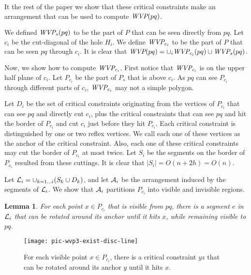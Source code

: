 \documentclass[5p]{elsarticle}
\newtheorem{lemma}[theorem]{Lemma}
\def\WVP{\mbox{\it{WVP}}}
\def\P{\mbox{${P}$}}
\begin{document}
It the rest of the paper we show that these critical constraints make an arrangement
that can be used to compute $\WVP(pq)$.  



We defined $\WVP_s(pq)$ to be the part of $\P$ that can be seen directly from $pq$.
Let $c_i$ be the cut-diagonal of the hole $H_i$.
We define $\WVP_{c_i}$ to be the part of $\P$ that can be seen $pq$ through $c_i$.
It is clear that $\WVP(pq) =  \cup_{i} \WVP_{c_i}(pq) \cup \WVP_s(pq) $. 

Now, we show how to compute $\WVP_{c_i}$. First notice that $\WVP_{c_i}$ is on the
upper half plane of $c_i$.
Let $\P_{c_i}$ be the part of $\P_s$ that is above $c_i$. 
As $pq$ can see $\P_{c_i}$ through different parts of $c_i$, $\WVP_{c_i}$
may not a simple polygon.

Let $D_i$ be the set of critical constraints originating from the vertices of $\P_{c_i}$
that can see $pq$ and directly cut $c_i$, plus the critical constraints
that can see $pq$ and hit the border of $\P_{c_i}$ and cut $c_i$ just before they hit $\P_{c_i}$.
Each critical constraint is distinguished by one or two reflex vertices. 
We call each one of these vertices as the anchor of the critical constraint.
Also, each one of these 
critical constraints may cut the border of $\P_{c_i}$ at most twice. Let $S_i$ be the segments 
on the border of $\P_{c_i}$ resulted from these cuttings. It is clear that 
$|S_i| = O(n + 2h) = O(n)$. 

Let ${\cal L}_i = \cup_{k=1 \ldots i}(S_k \cup D_k)$, and
let ${\cal A}_i$ be the arrangement induced by the segments of ${\cal L}_i$.
We show that ${\cal A}_i$ partitions $\P_{c_i}$ into visible and invisible 
regions.

\begin{lemma}
\label{lemma:e_exists}
For each point $x \in \P_{c_i}$ that is visible from $pq$, there is 
a segment $e$ in ${\cal L}_i$ that can be rotated around its anchor
until it hits $x$, while remaining visible to $pq$.
\end{lemma}

\begin{figure}[h]
  \centering
  \texttt{[image: pic-wvp3-exist-disc-line]} 
  \caption{For each visible point $x \in \P_{c_i}$, there is a  
  critical constraint $yz$ that can be rotated around its anchor $y$ until it hits $x$.}
  \label{fig:wvp3-exist-disc-line}
\end{figure}
\end{document}
